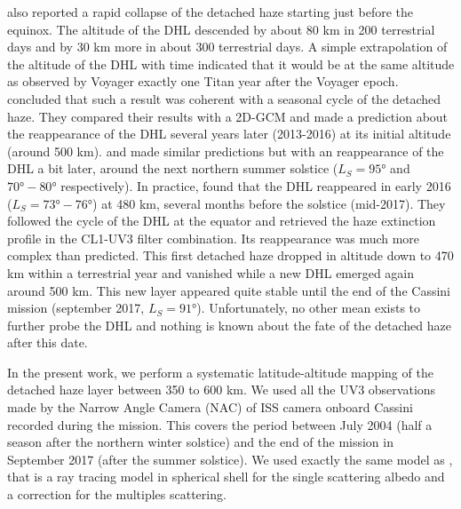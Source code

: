 \cite{West2011} also reported a rapid collapse of the detached haze starting just before the equinox. The altitude of
the DHL descended by about 80 km in 200 terrestrial days and by 30 km more in about 300 terrestrial days. A simple
extrapolation of the altitude of the DHL with time indicated that it would be at the same altitude as observed by Voyager
exactly one Titan year after the Voyager epoch. \cite{West2011} concluded that such a result was coherent with a seasonal
cycle of the detached haze.  They compared their results with a 2D-GCM and made a prediction about the reappearance of the
DHL several years later (2013-2016) at its initial altitude (around 500 km). \cite{Lebonnois2012} and \cite{Larson2015} made
similar predictions but with an reappearance of the DHL a bit later, around the next northern summer solstice ($L_S=\ang{95}$
and $\ang{70}-\ang{80}$ respectively). In practice, \cite{West2018} found that the DHL reappeared in early 2016
($L_S=\ang{73}-\ang{76}$) at 480 km, several months before the solstice (mid-2017). They followed the cycle of the DHL at the equator
and retrieved the haze extinction profile in the CL1-UV3 filter combination.
Its reappearance was much more complex than predicted. This first detached haze
dropped in altitude down to 470 km within a terrestrial year and vanished while a new DHL emerged again around 500 km. This
new layer appeared quite stable until the end of the Cassini mission (september 2017, $L_S=\ang{91}$). Unfortunately, no other
mean exists to further probe the DHL and nothing is known about the fate of the detached haze after this date.

\medskip

In the present work, we perform a systematic latitude-altitude mapping of the detached haze layer between 350 to 600 km.
We used all the UV3 observations made by the Narrow Angle Camera (NAC) of ISS camera onboard Cassini
recorded during the mission.
This covers the period between July 2004 (half a season after the northern winter solstice) and the end of
the mission in September 2017 (after the summer solstice). We used exactly the same model as \cite{West2018}, that is
a ray tracing model in spherical shell for the single scattering albedo and a correction for the multiples scattering.

